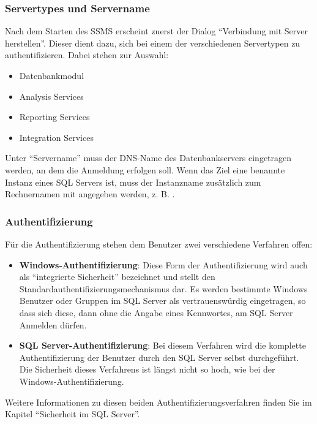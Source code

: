         \subsubsection{Servertypes und Servername}
          Nach dem Starten des SSMS erscheint zuerst der Dialog
          \enquote{Verbindung mit Server herstellen}. Dieser dient dazu, sich bei
          einem der verschiedenen Servertypen zu authentifizieren. Dabei stehen
          zur Auswahl:
          \begin{itemize}
            \item Datenbankmodul
            \item Analysis Services
            \item Reporting Services
            \item Integration Services
          \end{itemize}
          Unter \enquote{Servername} muss der DNS-Name des Datenbankservers
          eingetragen werden, an dem die Anmeldung erfolgen soll. Wenn das Ziel
          eine benannte Instanz eines SQL Servers ist, muss der Instanzname
          zusätzlich zum Rechnernamen mit angegeben werden, z. B.
          .
        \subsubsection{Authentifizierung}
          Für die Authentifizierung stehen dem Benutzer zwei verschiedene
          Verfahren offen:
          \begin{itemize}
            \item \textbf{Windows-Authentifizierung}: Diese Form der
            Authentifizierung wird auch als \enquote{integrierte Sicherheit}
            bezeichnet und stellt den Standardauthentifizierungsmechanismus dar.
            Es werden bestimmte Windows Benutzer oder Gruppen im SQL Server als
            vertrauenswürdig eingetragen, so dass sich diese, dann ohne die
            Angabe eines Kennwortes, am SQL Server Anmelden dürfen.
            \item \textbf{SQL Server-Authentifizierung}: Bei diesem Verfahren
            wird die komplette Authentifizierung der Benutzer durch den SQL
            Server selbst durchgeführt. Die Sicherheit dieses Verfahrens ist
            längst nicht so hoch, wie bei der Windows-Authentifizierung.
          \end{itemize}
          \begin{merke}
            Weitere Informationen zu diesen beiden Authentifizierungsverfahren
            finden Sie im Kapitel \enquote{Sicherheit im SQL Server}.
          \end{merke}
